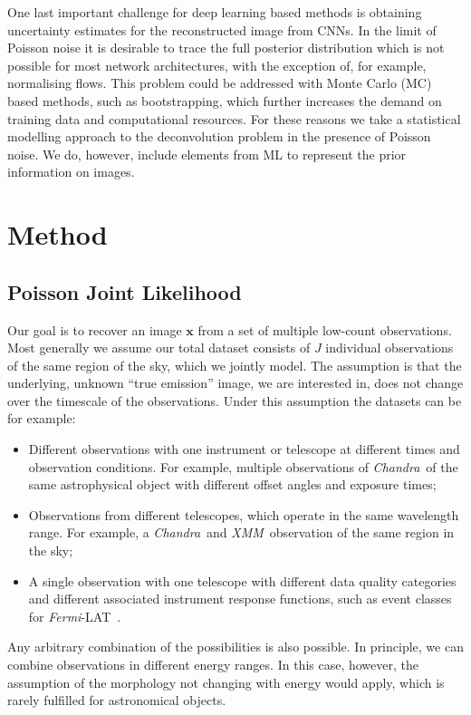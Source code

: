 \documentclass[twocolumn, linenumbers]{aastex631}
\newcommand{\chandra}{\textit{Chandra}~}
\newcommand{\xmm}{\textit{XMM}~}
\newcommand{\fermi}{\textit{Fermi}-LAT~}
\begin{document}
    One last important challenge for deep learning based methods is obtaining uncertainty estimates for the reconstructed image from CNNs. In the limit of Poisson noise it is desirable to trace the full posterior distribution
    which is not possible for most network architectures, with the exception of, for example, normalising flows. This problem could be addressed with Monte Carlo (MC) based methods, such as bootstrapping, which further increases the demand on training data and computational resources. For these reasons we take a statistical modelling approach to the deconvolution problem in the presence of Poisson noise. We do, however, include elements from ML to represent the prior information on images.

    \section{Method}
    
    \subsection{Poisson Joint Likelihood}
    Our goal is to recover an image $\mathbf{x}$ from a set of multiple low-count observations. Most generally we assume our total dataset consists of $J$ individual observations of the same region of the sky, which we jointly model. The assumption is that the underlying, unknown \enquote{true emission} image, we are interested in, does not change over the timescale of the observations. Under this assumption the datasets can be for example:

    \begin{itemize}
        \item Different observations with one instrument or telescope at different times and observation conditions. For example, multiple observations of \chandra of the same astrophysical object with different offset angles and exposure times;
        \item Observations from different telescopes, which operate in the same wavelength range. For example, a \chandra and \xmm observation of the same region in the sky;
        \item A single observation with one telescope with different data quality categories and different associated instrument response functions, such as event classes for \fermi.
    \end{itemize}

    Any arbitrary combination of the possibilities is also possible.
    In principle, we can combine observations in different energy ranges. In this case, however, the assumption of the morphology not changing with energy would apply, which is rarely fulfilled for astronomical objects.
    
\end{document}
